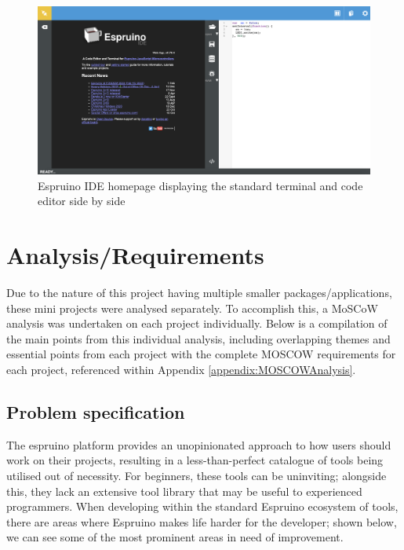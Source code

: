 \documentclass{l4proj}
\begin{document}
\begin{figure}[!ht]
    \centering
    \includegraphics[width=12cm]{dissertation/images/espruino-ide.png}
    \caption{Espruino IDE homepage displaying the standard terminal and code editor side by side}
    \label{fig:espruino-ide}
\end{figure}

\chapter{Analysis/Requirements}

\text Due to the nature of this project having multiple smaller packages/applications, these mini projects were analysed separately. To accomplish this, a MoSCoW analysis \citep{waters2009prioritization} was undertaken on each project individually. Below is a compilation of the main points from this individual analysis, including overlapping themes and essential points from each project with the complete MOSCOW requirements for each project, referenced within Appendix \ref{appendix:MOSCOWAnalysis}.

\section{Problem specification}
\text The espruino platform provides an unopinionated approach to how users should work on their projects, resulting in a less-than-perfect catalogue of tools being utilised out of necessity. For beginners, these tools can be uninviting; alongside this, they lack an extensive tool library that may be useful to experienced programmers. When developing within the standard Espruino ecosystem of tools, there are areas where Espruino makes life harder for the developer; shown below, we can see some of the most prominent areas in need of improvement.
\end{document}
